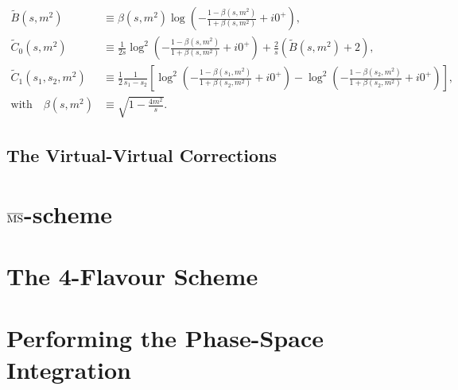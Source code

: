 \begin{equation}
\begin{split}
\tilde{B}\!(s, m^2) &\equiv \beta(s, m^2) \log\!\left(- \frac{1 - \beta(s, m^2)}{1 + \beta(s, m^2)} + i 0^+ \right), \\
\tilde{C}_0\!(s, m^2) &\equiv \frac{1}{2 s} \log^2\!\left(- \frac{1 - \beta(s, m^2)}{1 + \beta(s, m^2)} + i 0^+ \right) + \frac{2}{s} \left(\tilde{B}\!(s, m^2) + 2 \right), \\
\tilde{C}_1\!(s_1, s_2, m^2) &\equiv \frac{1}{2} \frac{1}{s_1 - s_2} \left[ \log^2\!\left(-\frac{1 - \beta(s_1, m^2)}{1 + \beta(s_2, m^2)} + i 0^+ \right) - \log^2\!\left(- \frac{1 - \beta(s_2, m^2)}{1 + \beta(s_2, m^2)} + i0^+\right) \right], \\
\text{with} \quad \beta(s, m^2) &\equiv \sqrt{1 - \frac{4 m^2}{s}}.
\end{split}
\end{equation}

\subsection{The Virtual-Virtual Corrections}
\section{\texorpdfstring{$\overline{\mathrm{MS}}$}{MS}-scheme}
\section{The 4-Flavour Scheme}\label{sec:5:4FS}
\section{Performing the Phase-Space Integration}



